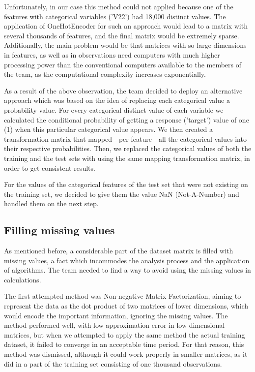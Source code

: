 \documentclass[conference, onecolumn]{IEEEtran}
\begin{document}
Unfortunately, in our case this method could not applied because one of the features with categorical variables ('V22') had 18,000 distinct values. The application of OneHotEncoder for such an approach would lead to a matrix with several thousands of features, and the final matrix would be extremely sparse. Additionally, the main problem would be that matrices with so large dimensions in features, as well as in observations need computers with much higher processing power than the conventional computers available to the members of the team, as the computational complexity increases exponentially.

As a result of the above observation, the team decided to deploy an alternative approach which was based on the idea of replacing each categorical value a probability value. For every categorical distinct value of each variable we calculated the conditional probability of getting a response ('target') value of one (1) when this particular categorical value appears. We then created a transformation matrix that mapped - per feature - all the categorical values into their respective probabilities. Then, we replaced the categorical values of both the training and the test sets with using the same mapping transformation matrix, in order to get consistent results. 

For the values of the categorical features of the test set that were not existing on the training set, we decided to give them the value NaN (Not-A-Number) and handled them on the next step.


\subsection{Filling missing values}
As mentioned before, a considerable part of the dataset matrix is filled with missing values, a fact which incommodes the analysis process and the application of algorithms. The team needed to find a way to avoid using the missing values in calculations.

The first attempted method was Non-negative Matrix Factorization, aiming to represent the data as the dot product of two matrices of lower dimensions, which would encode the important information, ignoring the missing values. The method performed well, with low approximation error in low dimensional matrices, but when we attempted to apply the same method the actual training dataset, it failed to converge in an acceptable time period. For that reason, this method was dismissed, although it could work properly in smaller matrices, as it did in a part of the training set consisting of one thousand observations.
\end{document}
